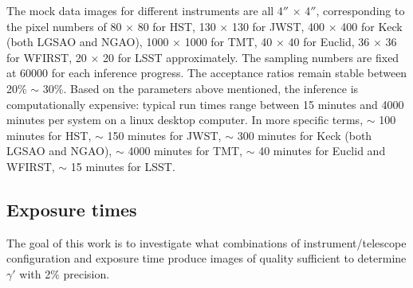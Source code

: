 \documentclass[a4paper,11pt]{article}
\begin{document}
{%

The mock data images for different instruments are all 4$''$ $\times$
4$''$, corresponding to the pixel numbers of 80 $\times$ 80 for HST,
130 $\times$ 130 for JWST, 400 $\times$ 400 for Keck (both LGSAO and
NGAO), 1000 $\times$ 1000 for TMT, 40 $\times$ 40 for Euclid, 36
$\times$ 36 for WFIRST, 20 $\times$ 20 for LSST approximately. The sampling
numbers are fixed at 60000 for each inference progress.
The acceptance ratios remain stable between 20\% $\sim$ 30\%.
Based on the parameters above mentioned, the inference is computationally expensive: typical run times range
between 15 minutes and 4000 minutes per system on a
linux desktop computer. In more specific terms, $\sim$ 100 minutes for HST,
$\sim$ 150 minutes for JWST, $\sim$ 300 minutes for Keck (both LGSAO and NGAO),
$\sim$ 4000 minutes for TMT, $\sim$ 40 minutes for Euclid and WFIRST, $\sim$ 15 minutes for LSST.

\subsection{Exposure times}

The goal of this work is to investigate what combinations of
instrument/telescope configuration and exposure time produce images of
quality sufficient to determine $\gamma'$ with 2\% precision.

}
\end{document}
